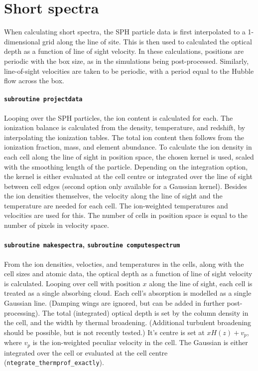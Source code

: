 \documentclass{report}
\newcommand{\param}[1]{{\tt #1}}
\begin{document}
\section{Short spectra}
When calculating short spectra, the SPH particle data is first interpolated to a 1-dimensional grid along the line of site. This is then used to calculated the optical depth as a function of line of sight velocity. In these calculations, positions are periodic with the box size, as in the simulations being post-processed. Similarly, line-of-sight velocities are taken to be periodic, with a period equal to the Hubble flow across the box.

\paragraph{{\tt subroutine projectdata}}
Looping over the SPH particles, the ion content is calculated for each. The ionization balance is calculated from the density, temperature, and redshift, by interpolating the ionization tables. The total ion content then follows from the ionization fraction, mass, and element abundance. To calculate the ion density in each cell along the line of sight in position space, the chosen kernel is used, scaled with the smoothing length of the particle. Depending on the integration option, the kernel is either evaluated at the cell centre or integrated over the line of sight between cell edges (second option only available for a Gaussian kernel). Besides the ion densities themselves, the velocity along the line of sight and the temperature are needed for each cell. The ion-weighted temperatures and velocities are used for this. The number of cells in position space is equal to the number of pixels in velocity space.

\paragraph{{\tt subroutine makespectra}, {\tt subroutine computespectrum}}
From the ion densities, velocties, and temperatures in the cells, along with the cell sizes and atomic data, the optical depth as a function of line of sight velocity is calculated. 
Looping over cell with position $x$ along the line of sight, each cell is treated as a single absorbing cloud. 
Each cell's absorption is modelled as a single Gaussian line. (Damping wings are ignored, but can be added in further post-processing). The total (integrated) optical depth is set by the column density in the cell, and the width by thermal broadening. (Additional turbulent broadening should be possible, but is not recently tested.) It's centre is set at $x H(z) + v_p$, where $v_p$ is the ion-weighted peculiar velocity in the cell. The Gaussian is either integrated over the cell or evaluated at the cell centre (\param{ntegrate\_thermprof\_exactly}).
 
\end{document}
